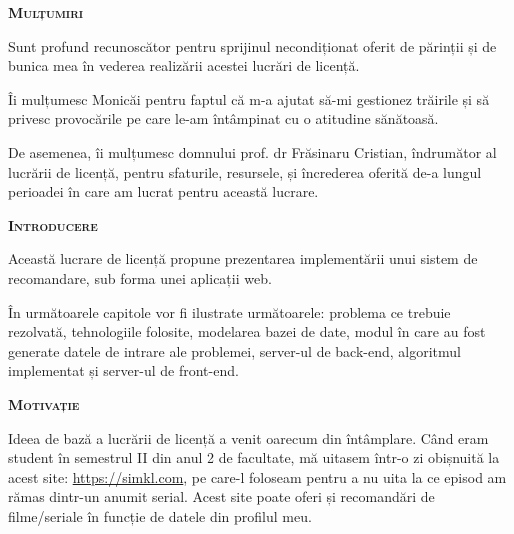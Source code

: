 \documentclass[12pt,a4paper]{report}
\begin{document}
\hfill \break
	\begin{center}
	{\scshape\large \textbf{Mulțumiri} \par}
	\end{center}
	
\begin{flushright}
\hfill \break
\hfill \break
Sunt profund recunoscător pentru sprijinul necondiționat oferit de părinții și de bunica mea în vederea realizării acestei lucrări de licență.
\end{flushright}
\hfill \break
\hfill \break
\hfill \break
\begin{flushright}
Îi mulțumesc Monicăi pentru faptul că m-a ajutat să-mi gestionez trăirile și să privesc provocările pe care le-am întâmpinat cu o atitudine sănătoasă.
\hfill \break
\hfill \break
\hfill \break
\end{flushright}
\begin{flushright}
De asemenea, îi mulțumesc domnului prof. dr Frăsinaru Cristian, îndrumător al lucrării de licență, pentru sfaturile, resursele, și încrederea oferită de-a lungul perioadei în care am lucrat pentru această lucrare.
\end{flushright}

\newpage
   
\renewcommand*{\contentsname}{Cuprins}
\tableofcontents
\newpage

\hfill \break

	\hfill \break
	\begin{center}
	{\scshape\large \textbf{Introducere} \par}
	\end{center}
	
	Această lucrare de licență propune prezentarea implementării unui sistem de recomandare, sub forma unei aplicații web.
	
	În următoarele capitole vor fi ilustrate următoarele: problema ce trebuie rezolvată, tehnologiile folosite, modelarea bazei de date, modul în care au fost generate datele de intrare ale problemei, server-ul de back-end, algoritmul implementat și server-ul de front-end.
	
	\begin{center}
	{\scshape\large \textbf{Motivație} \par}
	\end{center}

	Ideea de bază a lucrării de licență a venit oarecum din întâmplare. Când eram student în semestrul II din anul 2 de facultate, mă uitasem într-o zi obișnuită la acest site: \href{https://simkl.com/}{https://simkl.com}, pe care-l foloseam pentru a nu uita la ce episod am rămas dintr-un anumit serial. Acest site poate oferi și recomandări de filme/seriale în funcție de datele din profilul meu.
	
\end{document}
